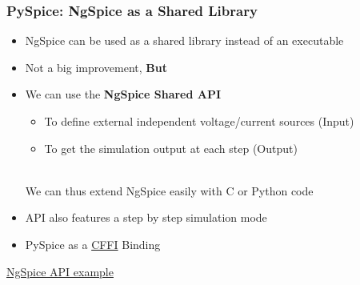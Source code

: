 \begin{frame}
  \frametitle{PySpice: NgSpice as a Shared Library}
  \begin{itemize}
  \item NgSpice can be used as a shared library instead of an executable
  \item Not a big improvement, \textbf{But}
  \item We can use the \textbf{NgSpice Shared API}
    \begin{itemize}
    \item To define external independent voltage/current sources (Input) %
    \item To get the simulation output at each step (Output)
    \end{itemize}
    \begin{center}
       \\
      \alert{We can thus extend NgSpice easily with C or Python code}
    \end{center}
  \item API also features a step by step simulation mode
  \item PySpice as a \href{http://cffi.readthedocs.io/en/latest/}{CFFI} Binding
  \end{itemize}
  \vspace{1em}
  \centerline{\small \href{https://pyspice.fabrice-salvaire.fr/examples/ngspice-shared/voltage-divider.html}{NgSpice API example}}
\end{frame}

